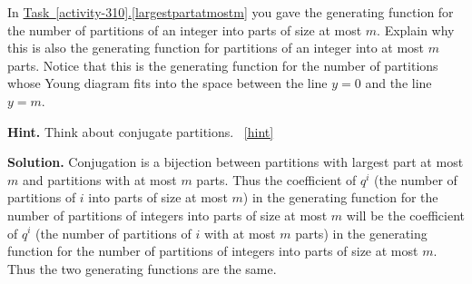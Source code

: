 \documentclass{book}
\begin{document}
\setcounter{project}{318}
\addtocounter{project}{-1}
\begin{activity}[]\label{atmostmparts}
\hypertarget{p-1615}{}%
In \hyperref[largestpartatmostm]{Task~\ref{activity-310}.\ref{largestpartatmostm}} you gave the generating function for the number of partitions of an integer into parts of size at most \(m\). Explain why this is also the generating function for partitions of an integer into at most \(m\) parts. Notice that this is the generating function for the number of partitions whose Young diagram fits into the space between the line \(y=0\) and the line \(y=m\).%
\par\smallskip%
\noindent\textbf{Hint.}\hypertarget{hint-207}{}\quad%
\hypertarget{p-1616}{}%
Think about conjugate partitions.%
~\hfill{\tiny\hyperlink{a-318}{[hint]}\hypertarget{q-318}{}}\par\smallskip%
\noindent\textbf{Solution.}\hypertarget{solution-232}{}\quad%
\hypertarget{p-1617}{}%
Conjugation is a bijection between partitions with largest part at most \(m\) and partitions with at most \(m\) parts. Thus the coefficient of \(q^i\) (the number of partitions of \(i\) into parts of size at most \(m\)) in the generating function for the number of partitions of integers into parts of size at most \(m\) will be the coefficient of \(q^i\) (the number of partitions of \(i\) with at most \(m\) parts) in the generating function for the number of partitions of integers into parts of size at most \(m\). Thus the two generating functions are the same.%
\end{activity}
\end{document}
